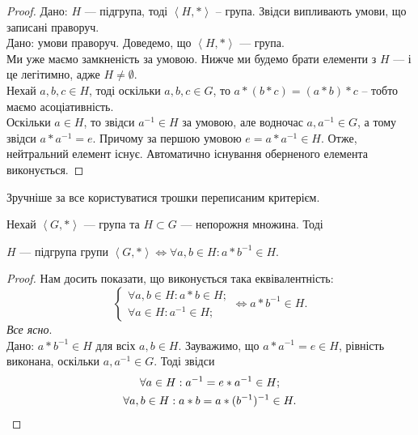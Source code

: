 \documentclass{math_library}
\begin{document}
\begin{proof}
\rightproof Дано: $H$ --- підгрупа, тоді $\left<H,* \right>$ -- група. Звідси випливають умови, що записані праворуч.
\bigskip \\
\leftproof Дано: умови праворуч. Доведемо, що $\left<H,* \right>$ --- група.\\
Ми уже маємо замкненість за умовою. Нижче ми будемо брати елементи з $H$ --- і це легітимно, адже $H \neq \emptyset$.\\
Нехай $a,b,c \in H$, тоді оскільки $a,b,c \in G$, то $a*(b*c) = (a*b)*c$ -- тобто маємо асоціативність.\\
Оскільки $a \in H$, то звідси $a^{-1} \in H$ за умовою, але водночас $a,a^{-1} \in G$, а тому звідси $a*a^{-1} = e$. Причому за першою умовою $e = a*a^{-1} \in H$. Отже, нейтральний елемент існує. Автоматично існування оберненого елемента виконується.
\end{proof}


Зручніше за все користуватися трошки переписаним критерієм.

\begin{corollary}
Нехай $\left<G,* \right>$ --- група та $H \subset G$ --- непорожня множина. Тоді
\begin{center}
$H$ --- підгрупа групи $\left<G,*\right> \iff \forall a,b \in H: a*b^{-1} \in H$.
\end{center}
\end{corollary}

\begin{proof}
Нам досить показати, що виконується така еквівалентність:
\[
\begin{cases} \forall a,b \in H: a*b \in H; \\ \forall a \in H: a^{-1} \in H; \end{cases} \iff a*b^{-1} \in H.
\]
\rightproof \textit{Все ясно}.\\
\leftproof Дано: $a*b^{-1} \in H$ для всіх $a,b \in H$. Зауважимо, що $a*a^{-1} = e \in H$, рівність виконана, оскільки $a,a^{-1} \in G$. Тоді звідси
\begin{gather*}
\forall a \in H: a^{-1} = e*a^{-1} \in H; \\
\forall a,b \in H: a*b = a*(b^{-1})^{-1} \in H.		\qedhere
\end{gather*}
\end{proof}
\end{document}
